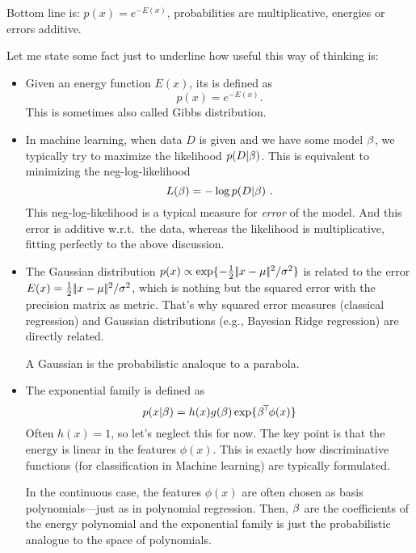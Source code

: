 Bottom line is: $p(x) = e^{-E(x)}$, probabilities are multiplicative,
energies or errors additive.

Let me state some fact just to underline how useful this way of
thinking is:
\begin{itemize}
\item Given an energy function $E(x)$, its  is defined as
\begin{equation}
 p(x) = e^{-E(x)}. 
\end{equation}
This is sometimes also called Gibbs distribution.

\item In machine learning, when data $D$ is given and we have some
model $\beta$, we typically try to maximize the likelihood
$p(D|\beta)$. This is equivalent to minimizing the neg-log-likelihood
\begin{equation}
L(\beta) = -\log p(D|\beta) ~.
\end{equation}
This neg-log-likelihood is a typical measure for \emph{error} of the
model. And this error is additive w.r.t.\ the data, whereas the
likelihood is multiplicative, fitting perfectly to the above
discussion.

\item The Gaussian distribution $p(x) \propto \exp\{
-\frac{1}{2} |\!|x-\mu|\!|^2/{\sigma^2} \}$ is related to the error $E(x)
 = \frac{1}{2} |\!|x-\mu|\!|^2/{\sigma^2}$, which is nothing but the squared
 error with the precision matrix as metric. That's why squared error
 measures (classical regression) and Gaussian distributions (e.g.,
 Bayesian Ridge regression) are directly related.

  A Gaussian is the probabilistic analoque to a parabola.

\item The exponential family is defined as
\begin{equation}
 p(x|\beta) = h(x) g(\beta) \exp\{\beta^{\!\top\!} \phi(x)\} 
\end{equation}
Often $h(x)=1$, so let's neglect this for now. The key point is that
the energy is linear in the features $\phi(x)$. This is exactly how
discriminative functions (for classification in Machine learning) are
typically formulated.

In the continuous case, the features $\phi(x)$ are often chosen as basis
polynomials---just as in polynomial regression. Then, $\beta$ are the
coefficients of the energy polynomial and the exponential family is
just the probabilistic analogue to the space of polynomials.


\end{itemize}
